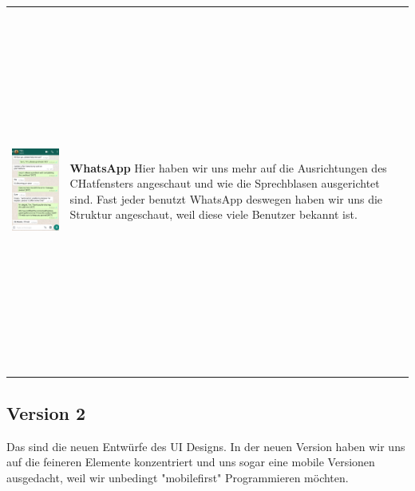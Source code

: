 \begin{tabular}{C{6cm}  L{7cm}}
        \includegraphics[width=\linewidth, height=12cm]{bilder/research pic/Tim Whatsapp.png} & \textbf{WhatsApp} \newline 
        Hier haben wir uns mehr auf die Ausrichtungen des CHatfensters angeschaut und wie die Sprechblasen 
        ausgerichtet sind. Fast jeder benutzt WhatsApp deswegen haben wir uns die Struktur angeschaut,
        weil diese viele Benutzer bekannt ist.
    \end{tabular}

\newpage
    

\subsection{Version 2}

Das sind die neuen Entwürfe des UI Designs. In der neuen Version haben wir uns auf die
feineren Elemente konzentriert und uns sogar eine mobile Versionen ausgedacht, weil wir
unbedingt "mobilefirst" Programmieren möchten.
\\

